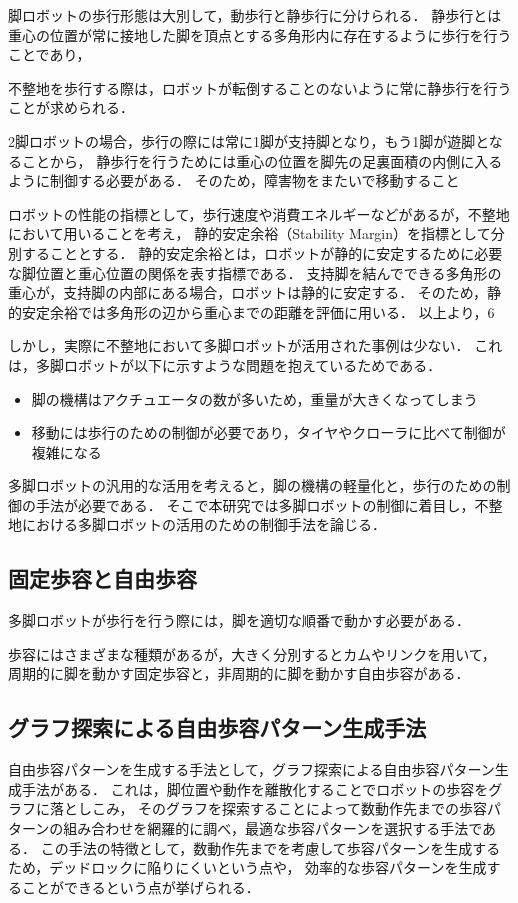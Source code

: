 脚ロボットの歩行形態は大別して，動歩行と静歩行に分けられる．
静歩行とは重心の位置が常に接地した脚を頂点とする多角形内に存在するように歩行を行うことであり，

不整地を歩行する際は，ロボットが転倒することのないように常に静歩行を行うことが求められる．

2脚ロボットの場合，歩行の際には常に1脚が支持脚となり，もう1脚が遊脚となることから，
静歩行を行うためには重心の位置を脚先の足裏面積の内側に入るように制御する必要がある．
そのため，障害物をまたいで移動すること

ロボットの性能の指標として，歩行速度や消費エネルギーなどがあるが，不整地において用いることを考え，
静的安定余裕\cite{Hirose_Static_stability_criterion}（Stability Margin）を指標として分別することとする．
静的安定余裕とは，ロボットが静的に安定するために必要な脚位置と重心位置の関係を表す指標である．
支持脚を結んでできる多角形の重心が，支持脚の内部にある場合，ロボットは静的に安定する．
そのため，静的安定余裕では多角形の辺から重心までの距離を評価に用いる．
以上より，6

しかし，実際に不整地において多脚ロボットが活用された事例は少ない．
これは，多脚ロボットが以下に示すような問題を抱えているためである\cite{Locomotion_for_difficult_terrain}．

\begin{itemize}
  \item 脚の機構はアクチュエータの数が多いため，重量が大きくなってしまう
  \item 移動には歩行のための制御が必要であり，タイヤやクローラに比べて制御が複雑になる
\end{itemize}

多脚ロボットの汎用的な活用を考えると，脚の機構の軽量化と，歩行のための制御の手法が必要である．
そこで本研究では多脚ロボットの制御に着目し，不整地における多脚ロボットの活用のための制御手法を論じる．

\subsection{固定歩容と自由歩容}
多脚ロボットが歩行を行う際には，脚を適切な順番で動かす必要がある．

歩容にはさまざまな種類があるが，大きく分別するとカムやリンクを用いて，
周期的に脚を動かす固定歩容と，非周期的に脚を動かす自由歩容がある．

\subsection{グラフ探索による自由歩容パターン生成手法}
自由歩容パターンを生成する手法として，グラフ探索による自由歩容パターン生成手法がある．
これは，脚位置や動作を離散化することでロボットの歩容をグラフに落としこみ，
そのグラフを探索することによって数動作先までの歩容パターンの組み合わせを網羅的に調べ，最適な歩容パターンを選択する手法である．
この手法の特徴として，数動作先までを考慮して歩容パターンを生成するため，デッドロックに陥りにくいという点や，
効率的な歩容パターンを生成することができるという点が挙げられる．

